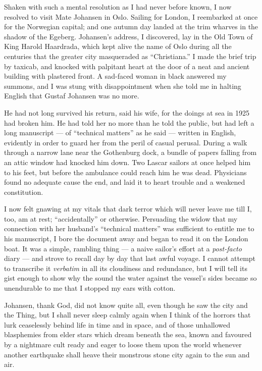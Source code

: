 \begin{pages}
\begin{Leftside}
Shaken with such a mental resolution as I had never before known, I now
resolved to visit Mate Johansen in Oslo. Sailing for London, I
reembarked at once for the Norwegian capital; and one autumn day landed
at the trim wharves in the shadow of the Egeberg. Johansen's address, I
discovered, lay in the Old Town of King Harold Haardrada, which kept
alive the name of Oslo during all the centuries that the greater city
masqueraded as ``Christiana.'' I made the brief trip by taxicab, and
knocked with palpitant heart at the door of a neat and ancient building
with plastered front. A sad-faced woman in black answered my summons,
and I was stung with disappointment when she told me in halting English
that Gustaf Johansen was no more.

He had not long survived his return, said his wife, for the doings at
sea in 1925 had broken him. He had told her no more than he told the
public, but had left a long manuscript --- of ``technical matters'' as he
said --- written in English, evidently in order to guard her from the
peril of casual perusal. During a walk through a narrow lane near the
Gothenburg dock, a bundle of papers falling from an attic window had
knocked him down. Two Lascar sailors at once helped him to his feet, but
before the ambulance could reach him he was dead. Physicians found no
adequate cause the end, and laid it to heart trouble and a weakened
constitution.

I now felt gnawing at my vitals that dark terror which
will never leave me till I, too, am at rest; ``accidentally'' or
otherwise. Persuading the widow that my connection with her husband's
``technical matters'' was sufficient to entitle me to his manuscript, I
bore the document away and began to read it on the London boat.
It was a simple, rambling thing --- a naive sailor's effort at a
\emph{post-facto} diary --- and strove to recall day by day that last awful
voyage. I cannot attempt to transcribe it \emph{verbatim} in all its cloudiness
and redundance, but I will tell its gist enough to show why the sound
the water against the vessel's sides became so unendurable to me that I
stopped my ears with cotton.

Johansen, thank God, did not know quite all, even though he saw the city
and the Thing, but I shall never sleep calmly again when I think of the
horrors that lurk ceaselessly behind life in time and in space, and of
those unhallowed blasphemies from elder stars which dream beneath the
sea, known and favoured by a nightmare cult ready and eager to loose
them upon the world whenever another earthquake shall heave their
monstrous stone city again to the sun and air.


\end{Leftside}
\end{pages}
